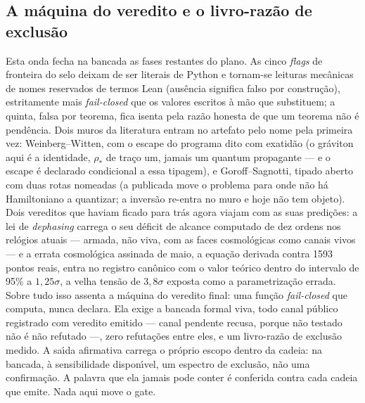 \documentclass[11pt]{article}
\theoremstyle{definition}\newtheorem{deriv}{Derivação}
\begin{document}
\subsection*{A m\'aquina do veredito e o livro-raz\~ao de exclus\~ao}Esta onda fecha na bancada as fases restantes do plano. As cinco \emph{flags} de fronteira do selo deixam de ser literais de Python e tornam-se leituras mec\^anicas de nomes reservados de termos Lean (aus\^encia significa falso por constru\c{c}\~ao), estritamente mais \emph{fail-closed} que os valores escritos \`a m\~ao que substituem; a quinta, falsa por teorema, fica isenta pela raz\~ao honesta de que um teorema n\~ao \'e pend\^encia. Dois muros da literatura entram no artefato pelo nome pela primeira vez: Weinberg--Witten, com o escape do programa dito com exatid\~ao (o gr\'aviton aqui \'e a identidade, $\rho_\ast$ de tra\c{c}o um, jamais um quantum propagante --- e o escape \'e declarado condicional a essa tipagem), e Goroff--Sagnotti, tipado aberto com duas rotas nomeadas (a publicada move o problema para onde n\~ao h\'a Hamiltoniano a quantizar; a invers\~ao re-entra no muro e hoje n\~ao tem objeto). Dois vereditos que haviam ficado para tr\'as agora viajam com as suas predi\c{c}\~oes: a lei de \emph{dephasing} carrega o seu d\'eficit de alcance computado de dez ordens nos rel\'ogios atuais --- armada, n\~ao viva, com as faces cosmol\'ogicas como canais vivos --- e a errata cosmol\'ogica assinada de maio, a equa\c{c}\~ao derivada contra 1593 pontos reais, entra no registro can\^onico com o valor te\'orico dentro do intervalo de 95\% a $1{,}25\sigma$, a velha tens\~ao de $3{,}8\sigma$ exposta como a parametriza\c{c}\~ao errada. Sobre tudo isso assenta a m\'aquina do veredito final: uma fun\c{c}\~ao \emph{fail-closed} que computa, nunca declara. Ela exige a bancada formal viva, todo canal p\'ublico registrado com veredito emitido --- canal pendente recusa, porque n\~ao testado n\~ao \'e n\~ao refutado ---, zero refuta\c{c}\~oes entre eles, e um livro-raz\~ao de exclus\~ao medido. A sa\'\i{}da afirmativa carrega o pr\'oprio escopo dentro da cadeia: na bancada, \`a sensibilidade dispon\'\i{}vel, um espectro de exclus\~ao, n\~ao uma confirma\c{c}\~ao. A palavra que ela jamais pode conter \'e conferida contra cada cadeia que emite. Nada aqui move o gate.
\end{document}

